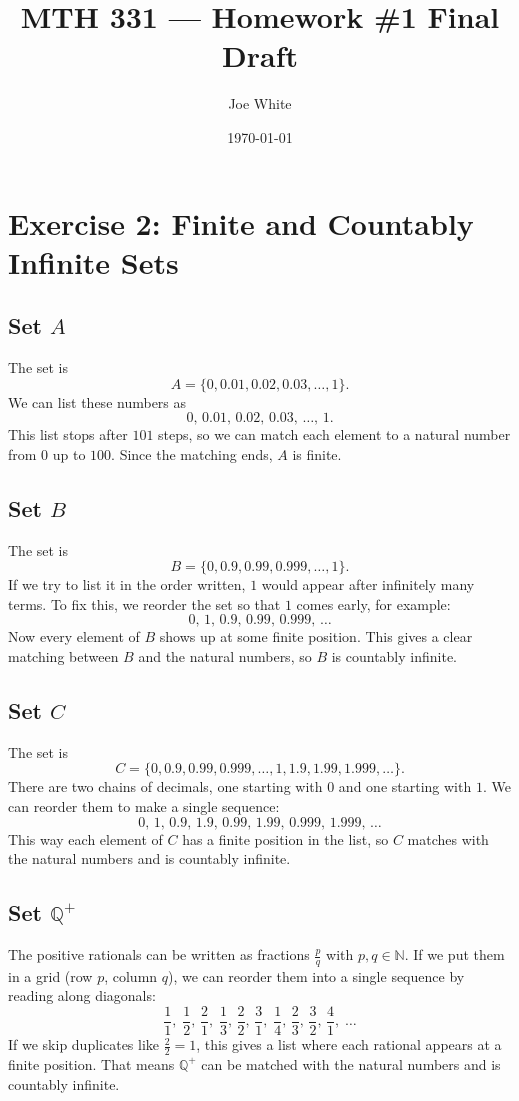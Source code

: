 \documentclass[11pt]{article}
\title{MTH 331 — Homework \#1 Final Draft}
\author{Joe White}
\date{\today}
\begin{document}
\maketitle

\section*{Exercise 2: Finite and Countably Infinite Sets}

\subsection*{Set $A$}
The set is 
\[
A = \{0, 0.01, 0.02, 0.03, \dots, 1\}.
\]
We can list these numbers as
\[
0,\,0.01,\,0.02,\,0.03,\,\dots,\,1.
\]
This list stops after $101$ steps, so we can match each element to a natural number from $0$ up to $100$. 
Since the matching ends, $A$ is finite.

\subsection*{Set $B$}
The set is
\[
B = \{0, 0.9, 0.99, 0.999, \dots, 1\}.
\]
If we try to list it in the order written, $1$ would appear after infinitely many terms. To fix this, we 
reorder the set so that $1$ comes early, for example:
\[
0,\,1,\,0.9,\,0.99,\,0.999,\,\dots
\]
Now every element of $B$ shows up at some finite position. This gives a clear matching between $B$ and the 
natural numbers, so $B$ is countably infinite.

\subsection*{Set $C$}
The set is
\[
C = \{0, 0.9, 0.99, 0.999, \dots, 1, 1.9, 1.99, 1.999, \dots\}.
\]
There are two chains of decimals, one starting with $0$ and one starting with $1$. We can reorder them 
to make a single sequence:
\[
0,\,1,\,0.9,\,1.9,\,0.99,\,1.99,\,0.999,\,1.999,\,\dots
\]
This way each element of $C$ has a finite position in the list, so $C$ matches with the natural numbers and 
is countably infinite.

\subsection*{Set $\mathbb{Q}^+$}
The positive rationals can be written as fractions $\tfrac{p}{q}$ with $p,q \in \mathbb{N}$. If we put them 
in a grid (row $p$, column $q$), we can reorder them into a single sequence by reading along diagonals:
\[
\frac{1}{1},\;\frac{1}{2},\,\frac{2}{1},\;\frac{1}{3},\,\frac{2}{2},\,\frac{3}{1},\;\frac{1}{4},\,\frac{2}{3},\,\frac{3}{2},\,\frac{4}{1},\;\dots
\]
If we skip duplicates like $\tfrac{2}{2}=1$, this gives a list where each rational appears at a finite 
position. That means $\mathbb{Q}^+$ can be matched with the natural numbers and is countably infinite.
\end{document}
